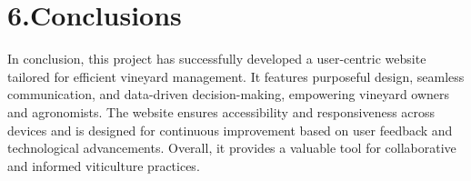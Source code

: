 \section{6.Conclusions}
In conclusion, this project has successfully developed a user-centric website tailored for efficient vineyard management. It features purposeful design, seamless communication, and data-driven decision-making, empowering vineyard owners and agronomists. The website ensures accessibility and responsiveness across devices and is designed for continuous improvement based on user feedback and technological advancements. Overall, it provides a valuable tool for collaborative and informed viticulture practices.